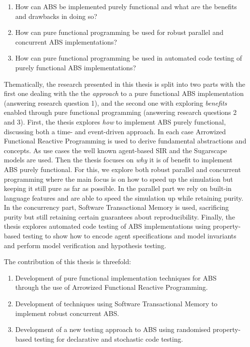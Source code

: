 \begin{enumerate}
	\item How can ABS be implemented purely functional and what are the benefits and drawbacks in doing so?
	\item How can pure functional programming be used for robust parallel and concurrent ABS implementations? 
	\item How can pure functional programming be used in automated code testing of purely functional ABS implementations?
\end{enumerate}

Thematically, the research presented in this thesis is split into two parts with the first one dealing with the the \textit{approach} to a pure functional ABS implementation (answering research question 1), and the second one with exploring \textit{benefits} enabled through pure functional programming (answering research questions 2 and 3).
First, the thesis explores \textit{how} to implement ABS purely functional, discussing both a time- and event-driven approach. In each case Arrowized Functional Reactive Programming is used to derive fundamental abstractions and concepts. As use cases the well known agent-based SIR and the Sugarscape models are used. Then the thesis focuses on \textit{why} it is of benefit to implement ABS purely functional. For this, we explore both robust parallel and concurrent programming where the main focus is on how to speed up the simulation but keeping it still pure as far as possible. In the parallel part we rely on built-in language features and are able to speed the simulation up while retaining purity. In the concurrency part, Software Transactional Memory is used, sacrificing purity but still retaining certain guarantees about reproducibility. Finally, the thesis explores automated code testing of ABS implementations using property-based testing to show how to encode agent specifications and model invariants and perform model verification and hypothesis testing.

The contribution of this thesis is threefold:
\begin{enumerate}
	\item Development of pure functional implementation techniques for ABS \\ through the use of Arrowized Functional Reactive Programming.
	\item Development of techniques using Software Transactional Memory to implement robust concurrent ABS.
	\item Development of a new testing approach to ABS using randomised property-based testing for declarative and stochastic code testing.
\end{enumerate}


